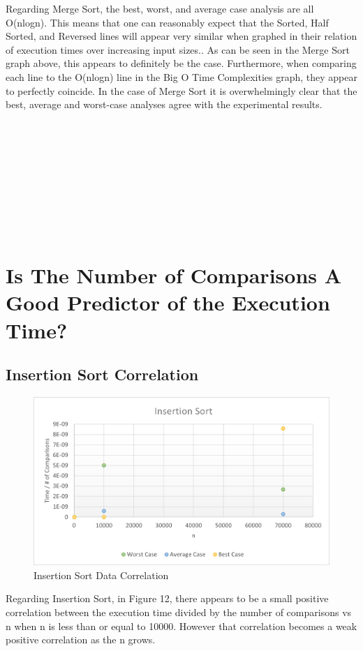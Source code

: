 \documentclass[12pt]{article}
\begin{document}
	Regarding Merge Sort, the best, worst, and average case analysis are all O(nlogn). This means that one can reasonably expect that the Sorted, Half Sorted, and Reversed lines will appear very similar when graphed in their relation of execution times over increasing input sizes.. As can be seen in the Merge Sort graph above, this appears to definitely be the case. Furthermore, when comparing each line to the O(nlogn) line in the Big O Time Complexities graph, they appear to perfectly coincide. In the case of Merge Sort it is overwhelmingly clear that the best, average and worst-case analyses agree with the experimental results.\\
\indent \\\\\\\\\\\\\\\\\\
\section {Is The Number of Comparisons A Good Predictor of the Execution Time?}

\subsection{Insertion Sort Correlation} 

\begin{figure}[H]
	\centering
	\includegraphics[width=\textwidth]{Icorr.png}
\caption{Insertion Sort Data Correlation}
    \label{fig:mesh1}
\end{figure}

	Regarding Insertion Sort, in Figure 12, there appears to be a small positive correlation between the execution time divided by the number of comparisons vs n when n is less than or equal to 10000. However that correlation becomes a weak positive correlation as the n grows.\\
\\
\\
\\
\\
\\
\\
\end{document}

